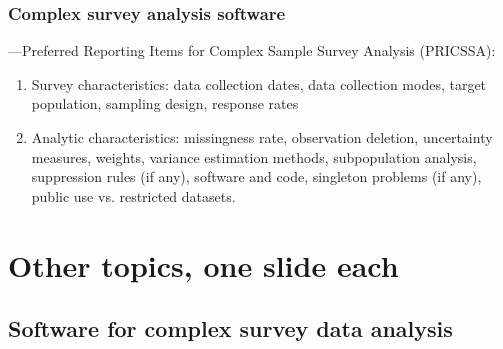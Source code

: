 \documentclass{beamer}
\begin{document}
\begin{frame}\frametitle{Complex survey analysis software}

\citet{seid:west:moser:2023}---Preferred Reporting Items 
for Complex Sample Survey Analysis (PRICSSA):

\begin{enumerate}
	\item Survey characteristics: data collection dates, data collection modes, 
	      target population, sampling design, response rates \citep{aapor:2016:standard:definitions}
   \item Analytic characteristics: missingness rate, observation deletion, uncertainty measures,
         weights, variance estimation methods, subpopulation analysis, suppression rules (if any),
         software and code, singleton problems (if any), public use vs. restricted datasets.
\end{enumerate}

\end{frame}

\section{Other topics, one slide each}

\subsection{Software for complex survey data analysis}
\end{document}
